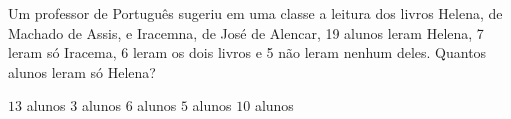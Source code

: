 \noindent\parbox{\linewidth}{

Um professor de Português sugeriu em uma classe a leitura dos livros Helena, de Machado de Assis, e Iracemna, de José de Alencar, 19 alunos leram Helena, 7 leram só Iracema, 6 leram os dois livros e 5 não leram nenhum deles. Quantos alunos leram só Helena?

$13$ alunos
$3$ alunos
$6$ alunos
$5$ alunos
$10$ alunos



}


